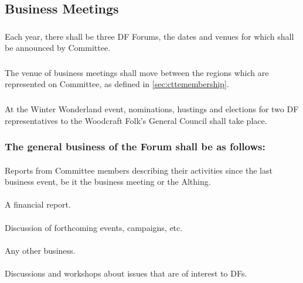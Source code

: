 \documentclass[a4paper, 12pt]{article}
\begin{document}
\subsection{Business Meetings}
\subsubsection{}
Each year, there shall be three DF Forums, the dates and venues for which shall be announced by Committee. 
\subsubsection{}
The venue of business meetings shall move between the regions which are represented on Committee, as defined in \ref{sec:cttemembership}.
\subsubsection{}
At the Winter Wonderland event, nominations, hustings and elections for two DF representatives to the Woodcraft Folk’s General Council shall take place.
\subsubsection{The general business of the Forum shall be as follows:}
\paragraph{}
Reports from Committee members describing their activities since the last business event, be it the business meeting or the Althing.
\paragraph{}
A financial report.
\paragraph{}
Discussion of forthcoming events, campaigns, etc. 
\paragraph{}
Any other business.
\paragraph{}
Discussions and workshops about issues that are of interest to DFs. 
\end{document}
